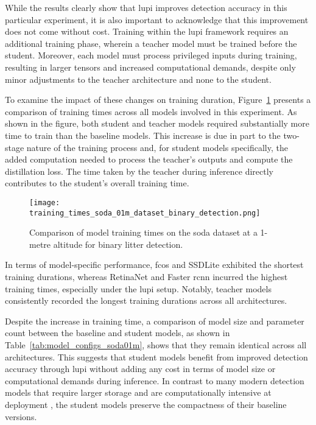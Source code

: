 While the results clearly show that \gls{lupi} improves detection accuracy in this particular experiment, it is also important to acknowledge that this improvement does not come without cost. Training within the \gls{lupi} framework requires an additional training phase, wherein a teacher model must be trained before the student. Moreover, each model must process privileged inputs during training, resulting in larger tensors and increased computational demands, despite only minor adjustments to the teacher architecture and none to the student.

To examine the impact of these changes on training duration, Figure~\ref{fig:soda01m_training_time} presents a comparison of training times across all models involved in this experiment. As shown in the figure, both student and teacher models required substantially more time to train than the baseline models. This increase is due in part to the two-stage nature of the training process and, for student models specifically, the added computation needed to process the teacher’s outputs and compute the distillation loss. The time taken by the teacher during inference directly contributes to the student’s overall training time.

\begin{figure}[!ht]
    \centering
    \texttt{[image: training\_times\_soda\_01m\_dataset\_binary\_detection.png]}
    \caption{Comparison of model training times on the \gls{soda} dataset at a 1-metre altitude for binary litter detection.}
    \label{fig:soda01m_training_time}
\end{figure}

In terms of model-specific performance, \gls{fcos} and SSDLite exhibited the shortest training durations, whereas RetinaNet and Faster \gls{rcnn} incurred the highest training times, especially under the \gls{lupi} setup. Notably, teacher models consistently recorded the longest training durations across all architectures.

Despite the increase in training time, a comparison of model size and parameter count between the baseline and student models, as shown in Table~\ref{tab:model_configs_soda01m}, shows that they remain identical across all architectures. This suggests that student models benefit from improved detection accuracy through \gls{lupi} without adding any cost in terms of model size or computational demands during inference. In contrast to many modern detection models that require larger storage and are computationally intensive at deployment \cite{detr, rt-detr, rt-detrv2, rf-detr}, the student models preserve the compactness of their baseline versions.


